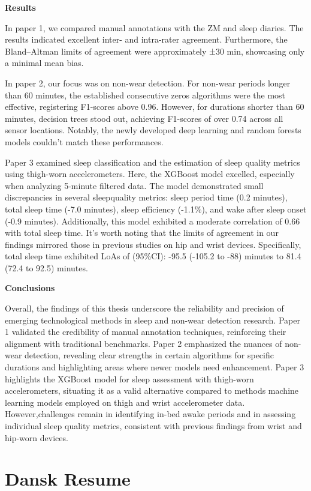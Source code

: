 \documentclass[
  10pt,
]{scrbook}
\begin{document}
\textbf{Results}

In paper 1, we compared manual annotations with the ZM and sleep
diaries. The results indicated excellent inter- and intra-rater
agreement. Furthermore, the Bland--Altman limits of agreement were
approximately ±30 min, showcasing only a minimal mean bias.

In paper 2, our focus was on non-wear detection. For non-wear periods
longer than 60 minutes, the established consecutive zeros algorithms
were the most effective, registering F1-scores above 0.96. However, for
durations shorter than 60 minutes, decision trees stood out, achieving
F1-scores of over 0.74 across all sensor locations. Notably, the newly
developed deep learning and random forests models couldn't match these
performances.

Paper 3 examined sleep classification and the estimation of sleep
quality metrics using thigh-worn accelerometers. Here, the XGBoost model
excelled, especially when analyzing 5-minute filtered data. The model
demonstrated small discrepancies in several sleepquality metrics: sleep
period time (0.2 minutes), total sleep time (-7.0 minutes), sleep
efficiency (-1.1\%), and wake after sleep onset (-0.9 minutes).
Additionally, this model exhibited a moderate correlation of 0.66 with
total sleep time. It's worth noting that the limits of agreement in our
findings mirrored those in previous studies on hip and wrist devices.
Specifically, total sleep time exhibited LoAs of (95\%CI): -95.5 (-105.2
to -88) minutes to 81.4 (72.4 to 92.5) minutes.

\textbf{Conclusions}

Overall, the findings of this thesis underscore the reliability and
precision of emerging technological methods in sleep and non-wear
detection research. Paper 1 validated the credibility of manual
annotation techniques, reinforcing their alignment with traditional
benchmarks. Paper 2 emphasized the nuances of non-wear detection,
revealing clear strengths in certain algorithms for specific durations
and highlighting areas where newer models need enhancement. Paper 3
highlights the XGBoost model for sleep assessment with thigh-worn
accelerometers, situating it as a valid alternative compared to methods
machine learning models employed on thigh and wrist accelerometer data.
However,challenges remain in identifying in-bed awake periods and in
assessing individual sleep quality metrics, consistent with previous
findings from wrist and hip-worn devices.

\hypertarget{dansk-resume}{%
\chapter{Dansk Resume}\label{dansk-resume}}
\end{document}
